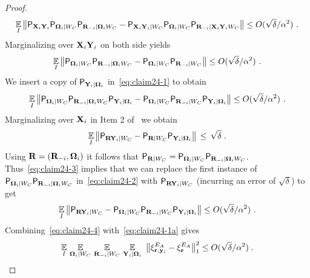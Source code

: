 \begin{proof}
 
\[
\Ex_I \left \|  \P_{\bX_i \bY_i} \P_{\bOmega_i | W_C} \P_{\bR_\mi | \bOmega_i  W_C} - \P_{\bX_i \bY_i | W_C}  \P_{\bOmega_i | W_C} \P_{\bR_\mi | \bX_i \bY_i  W_C} \right \| \leq O(\sqrt{\delta}/\alpha^2)~.
\]
Marginalizing over $\bX_i \bY_i$ on both side yields
\begin{equation}\label{eq:claim24-1}
\Ex_I \left \| \P_{\bOmega_i | W_C} \P_{\bR_\mi | \bOmega_i  W_C} -  \P_{\bOmega_i | W_C} \P_{\bR_\mi | W_C} \right \| \leq O(\sqrt{\delta}/\alpha^2)~.
\end{equation}
We insert a copy of $\P_{\bY_i | \bOmega_i }$ in~\eqref{eq:claim24-1} to obtain 
\begin{equation}\label{eq:claim24-2}
\Ex_I \left \| \P_{\bOmega_i | W_C}\P_{\bR_\mi | \bOmega_i  W_C} \P_{\bY_i | \bOmega_i }  - \P_{\bOmega_i | W_C} \P_{\bR_\mi | W_C}  \P_{\bY_i | \bOmega_i } \right \| \leq O(\sqrt{\delta}/\alpha^2)~.
\end{equation}
Marginalizing over $\bX_i$ in Item 2 of~ we obtain
\begin{equation}\label{eq:claim24-3}
\Ex_{I} \big\|\P_{\bR \bY_i | W_C} - \P_{\bR | W_C} \P_{\bY_i | \bOmega_i }\big\| \,\leq\,\sqrt{\delta}\;.
\end{equation}
Using $\bR = (\bR_\mi,\bOmega_i)$ it follows that $\P_{\bR | W_C}=\P_{\bOmega_i | W_C} \P_{\bR_\mi | \bOmega_i  W_C}$. Thus~\eqref{eq:claim24-3} implies that we can replace the first instance of $\P_{\bOmega_i | W_C} \P_{\bR_\mi | \bOmega_i  W_C}$ in~\eqref{eq:claim24-2} with $\P_{\bR \bY_i | W_C}$ (incurring an error of $\sqrt{\delta}$) to get
\begin{equation}\label{eq:claim24-4}
\Ex_I \left \| \P_{\bR \bY_i | W_C} -\P_{\bOmega_i | W_C} \P_{\bR_\mi | W_C}  \P_{\bY_i | \bOmega_i }  \right \| \leq O(\sqrt{\delta}/\alpha^2)~.
\end{equation}
Combining~\eqref{eq:claim24-4} with~\eqref{eq:claim24-1a} gives
\[
	\Ex_I \, \Ex_{\bOmega_i | W_C} \, \Ex_{\bR_\mi | W_C} \, \Ex_{\bY_i | \bOmega_i} \,\, \big \| \xi^{E_A}_{\br,\by_i} -  \xi^{E_A}_{\br} \big \|_1^2 \leq O(\sqrt{\delta}/\alpha^2)\;.
\]
 
 

\end{proof}
